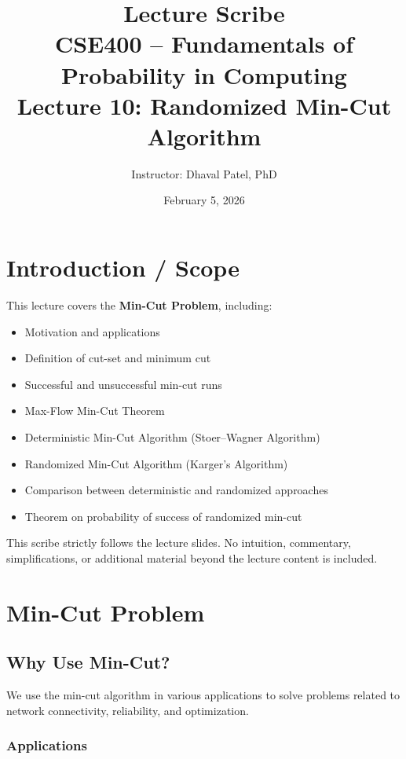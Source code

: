 \documentclass[12pt]{article}
\title{Lecture Scribe\\
CSE400 -- Fundamentals of Probability in Computing\\
Lecture 10: Randomized Min-Cut Algorithm}
\author{Instructor: Dhaval Patel, PhD}
\date{February 5, 2026}
\begin{document}
\maketitle

\section{Introduction / Scope}

This lecture covers the \textbf{Min-Cut Problem}, including:

\begin{itemize}
\item Motivation and applications
\item Definition of cut-set and minimum cut
\item Successful and unsuccessful min-cut runs
\item Max-Flow Min-Cut Theorem
\item Deterministic Min-Cut Algorithm (Stoer--Wagner Algorithm)
\item Randomized Min-Cut Algorithm (Karger’s Algorithm)
\item Comparison between deterministic and randomized approaches
\item Theorem on probability of success of randomized min-cut
\end{itemize}

This scribe strictly follows the lecture slides. No intuition, commentary, simplifications, or additional material beyond the lecture content is included.

\section{Min-Cut Problem}

\subsection{Why Use Min-Cut?}

We use the min-cut algorithm in various applications to solve problems related to network connectivity, reliability, and optimization.

\subsubsection*{Applications}
\end{document}
